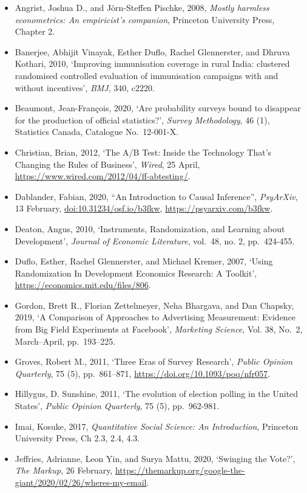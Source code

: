 \documentclass[
]{book}
\providecommand{\tightlist}{%
  \setlength{\itemsep}{0pt}\setlength{\parskip}{0pt}}
\begin{document}
\begin{itemize}
\tightlist
\item
  Angrist, Joshua D., and Jörn-Steffen Pischke, 2008, \emph{Mostly harmless econometrics: An empiricist's companion}, Princeton University Press, Chapter 2.
\item
  Banerjee, Abhijit Vinayak, Esther Duflo, Rachel Glennerster, and Dhruva Kothari, 2010, `Improving immunisation coverage in rural India: clustered randomised controlled evaluation of immunisation campaigns with and without incentives', \emph{BMJ}, 340, c2220.
\item
  Beaumont, Jean-François, 2020, `Are probability surveys bound to disappear for the production of official statistics?', \emph{Survey Methodology}, 46 (1), Statistics Canada, Catalogue No.~12-001-X.
\item
  Christian, Brian, 2012, `The A/B Test: Inside the Technology That's Changing the Rules of Business', \emph{Wired}, 25 April, \url{https://www.wired.com/2012/04/ff-abtesting/}.
\item
  Dablander, Fabian, 2020, ``An Introduction to Causal Inference'', \emph{PsyArXiv}, 13 February, \url{doi:10.31234/osf.io/b3fkw}, \url{https://psyarxiv.com/b3fkw}.
\item
  Deaton, Angus, 2010, `Instruments, Randomization, and Learning about Development', \emph{Journal of Economic Literature}, vol.~48, no. 2, pp.~424-455.
\item
  Duflo, Esther, Rachel Glennerster, and Michael Kremer, 2007, `Using Randomization In Development Economics Research: A Toolkit', \url{https://economics.mit.edu/files/806}.
\item
  Gordon, Brett R., Florian Zettelmeyer, Neha Bhargava, and Dan Chapsky, 2019, `A Comparison of Approaches to Advertising Measurement: Evidence from Big Field Experiments at Facebook', \emph{Marketing Science}, Vol. 38, No.~2, March--April, pp.~193--225.
\item
  Groves, Robert M., 2011, `Three Eras of Survey Research', \emph{Public Opinion Quarterly}, 75 (5), pp.~861--871, \url{https://doi.org/10.1093/poq/nfr057}.
\item
  Hillygus, D. Sunshine, 2011, `The evolution of election polling in the United States', \emph{Public Opinion Quarterly}, 75 (5), pp.~962-981.
\item
  Imai, Kosuke, 2017, \emph{Quantitative Social Science: An Introduction}, Princeton University Press, Ch 2.3, 2.4, 4.3.
\item
  Jeffries, Adrianne, Leon Yin, and Surya Mattu, 2020, `Swinging the Vote?', \emph{The Markup}, 26 February, \url{https://themarkup.org/google-the-giant/2020/02/26/wheres-my-email}.

\end{itemize}
\end{document}
